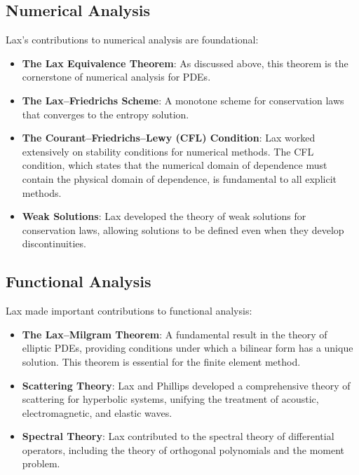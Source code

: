 \subsection{Numerical Analysis}

Lax's contributions to numerical analysis are foundational:

\begin{itemize}
\item \textbf{The Lax Equivalence Theorem}: As discussed above, this theorem is the cornerstone of numerical analysis for PDEs.

\item \textbf{The Lax--Friedrichs Scheme}: A monotone scheme for conservation laws that converges to the entropy solution.

\item \textbf{The Courant--Friedrichs--Lewy (CFL) Condition}: Lax worked extensively on stability conditions for numerical methods. The CFL condition, which states that the numerical domain of dependence must contain the physical domain of dependence, is fundamental to all explicit methods.

\item \textbf{Weak Solutions}: Lax developed the theory of weak solutions for conservation laws, allowing solutions to be defined even when they develop discontinuities.
\end{itemize}

\subsection{Functional Analysis}

Lax made important contributions to functional analysis:

\begin{itemize}
\item \textbf{The Lax--Milgram Theorem}: A fundamental result in the theory of elliptic PDEs, providing conditions under which a bilinear form has a unique solution. This theorem is essential for the finite element method.

\item \textbf{Scattering Theory}: Lax and Phillips developed a comprehensive theory of scattering for hyperbolic systems, unifying the treatment of acoustic, electromagnetic, and elastic waves.

\item \textbf{Spectral Theory}: Lax contributed to the spectral theory of differential operators, including the theory of orthogonal polynomials and the moment problem.
\end{itemize}

